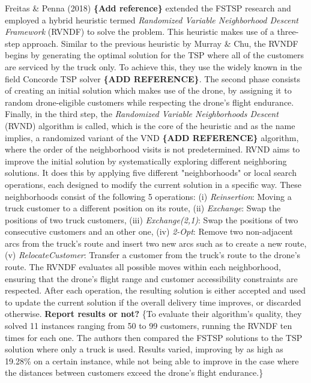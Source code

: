 \documentclass{article}
\begin{document}
	Freitas \& Penna (2018) \textbf{\{Add reference\}} extended the FSTSP research and employed a hybrid heuristic termed \textit{Randomized Variable Neighborhood Descent Framework} (RVNDF) to solve the problem. This heuristic makes use of a three-step approach. Similar to the previous heuristic by Murray \& Chu, the RVNDF begins by generating the optimal solution for the TSP where all of the customers are serviced by the truck only. To achieve this, they use the widely known in the field Concorde TSP solver \textbf{\{ADD REFERENCE\}}. The second phase consists of creating an initial solution which makes use of the drone, by assigning it to random drone-eligible customers while respecting the drone's flight endurance. Finally, in the third step, the \textit{Randomized Variable Neighborhoods Descent} (RVND) algorithm is called, which is the core of the heuristic and as the name implies, a randomized variant of the VND \textbf{\{ADD REFERENCE\}} algorithm, where the order of the neighborhood visits is not predetermined. RVND aims to improve the initial solution by systematically exploring different neighboring solutions. It does this by applying five different "neighborhoods" or local search operations, each designed to modify the current solution in a specific way. These neighborhoods consist of the following 5 operations: (i) \textit{Reinsertion}: Moving a truck customer to a different position on its route, (ii) \textit{Exchange}: Swap the positions of two truck customers, (iii) \textit{Exchange(2,1)}: Swap the positions of two consecutive customers and  an other one, (iv) \textit{2-Opt}: Remove two non-adjacent arcs from the truck's route and insert two new arcs such as to create a new route, (v) \textit{RelocateCustomer}: Transfer a customer from the truck's route to the drone's route. The RVNDF evaluates all possible moves within each neighborhood, ensuring that the drone's flight range and customer accessibility constraints are respected. After each operation, the resulting solution is either accepted and used to update the current solution if the overall delivery time improves, or discarded otherwise. \textbf{Report results or not?} \{To evaluate their algorithm's quality, they solved 11 instances ranging from 50 to 99 customers, running the RVNDF ten times for each one. The authors then compared the FSTSP solutions to the TSP solution where only a truck is used. Results varied, improving by as high as 19.28\% on a certain instance, while not being able to improve in the case where the distances between customers exceed the drone's flight endurance.\}
	
\end{document}
